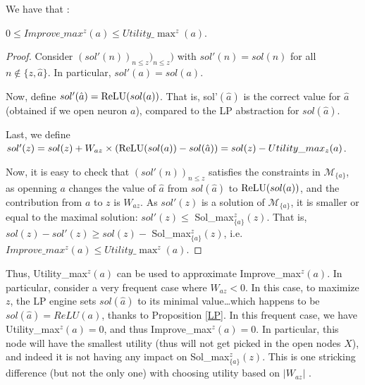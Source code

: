 We have that :

\begin{proposition}
$0 \leq Improve\_max^z(a) \leq Utility\_\max^z(a)$. 
\end{proposition}

\begin{proof}
Consider $(sol'(n))_{n \leq z})_{n \leq z})$ with
$sol'(n)=sol(n)$ for all $n \notin \{z,\hat{a}\}$.
In particular,  $sol'(a) = sol(a)$.

Now, define $sol'(\hat{a}) = \mathrm{ReLU}(sol(a))$. 
That is,  
sol'$(\hat{a})$ is the correct value for $\hat{a}$ (obtained if we open neuron $a$), 
compared to the LP abstraction for $sol(\hat{a})$.

Last, we define $sol'(z)=sol(z) + W_{az} \times (\mathrm{ReLU}(sol(a)) - sol(\hat{a})) = sol(z) - Utility\_max_z(a)$.

Now, it is easy to check that $(sol'(n))_{n \leq z}$ satisfies the constraints in 
$\mathcal{M}_{\{a\}}$, as openning $a$ changes the value of $\hat{a}$ from
$sol(\hat{a})$ to $\mathrm{ReLU}(sol(a))$, and the contribution from $a$ to $z$ is 
$W_{az}$. As $sol'(z)$ is a solution of $\mathcal{M}_{\{a\}}$, it is smaller or equal to the maximal solution: $sol'(z) \leq$ Sol\_max$_{\{a\}}^z(z)$. That is, 
$sol(z)-sol'(z) \geq sol(z) -$ Sol\_max$_{\{a\}}^z(z)$, i.e. 
$Improve\_max^z(a) \leq Utility\_\max^z(a)$.
\end{proof}

Thus, Utility\_max$^z(a)$ can be used to approximate 
Improve\_max$^z(a)$. In particular, consider a very frequent case where $W_{az}<0$.
In this case, to maximize $z$, the LP engine sets $sol(\hat{a})$ to its minimal value\dots which happens to be $sol(\hat{a})=ReLU(a)$, thanks to Proposition \ref{LP}. 
In this frequent case, we have Utility\_max$^z(a)=0$, and thus Improve\_max$^z(a)=0$. 
In particular, this node will have the smallest utility (thus will not get picked in the open nodes $X$), and indeed it is not having any impact on  Sol\_max$_{\{a\}}^z(z)$. 
This is one stricking difference (but not the only one) with choosing utility based on 
$|W_{az}|$ \cite{DivideAndSlide}.

	
%	
	
